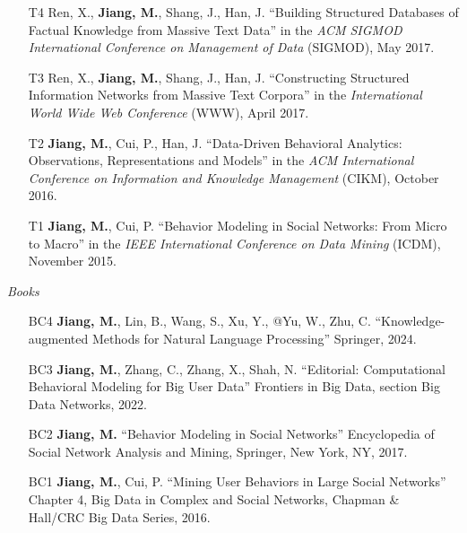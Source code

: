 \documentclass[10pt]{article}
\newenvironment{myindentpar}[1]%
{\begin{list}{}%
         {\setlength{\leftmargin}{#1}}%
         \item[]%
}
{\end{list}}
\newcounter{list}
\begin{document}
\begin{myindentpar}{0.00cm}
\begin{enumerate}[leftmargin=.5cm]
\item[T4] Ren, X., \textbf{Jiang, M.}, Shang, J., Han, J. ``Building Structured Databases of Factual Knowledge from Massive Text Data'' in the \textit{ACM SIGMOD International Conference on Management of Data} (SIGMOD), May 2017.
		
\item[T3] Ren, X., \textbf{Jiang, M.}, Shang, J., Han, J. ``Constructing Structured Information Networks from Massive Text Corpora'' in the \textit{International World Wide Web Conference}  (WWW), April 2017.

\item[T2] \textbf{Jiang, M.}, Cui, P., Han, J. ``Data-Driven Behavioral Analytics: Observations, Representations and Models'' in the \textit{ACM International Conference on Information and Knowledge Management} (CIKM), October 2016.
		
\item[T1] \textbf{Jiang, M.}, Cui, P. ``Behavior Modeling in Social Networks: From Micro to Macro'' in the \textit{IEEE International Conference on Data Mining} (ICDM), November 2015.

\end{enumerate}

\hspace{-0.25cm}\textit{Books}

\begin{enumerate}[leftmargin=.5cm]

\item[BC4] \textbf{Jiang, M.}, Lin, B., Wang, S., Xu, Y., @Yu, W., Zhu, C. ``Knowledge-augmented Methods for Natural Language Processing'' Springer, 2024.

\item[BC3] \textbf{Jiang, M.}, Zhang, C., Zhang, X., Shah, N. ``Editorial: Computational Behavioral Modeling for Big User Data'' Frontiers in Big Data, section Big Data Networks, 2022.
		
\item[BC2] \textbf{Jiang, M.} ``Behavior Modeling in Social Networks'' Encyclopedia of Social Network Analysis and Mining, Springer, New York, NY, 2017.
		
\item[BC1] \textbf{Jiang, M.}, Cui, P. ``Mining User Behaviors in Large Social Networks'' Chapter 4, Big Data in Complex and Social Networks, Chapman \& Hall/CRC Big Data Series, 2016.

\end{enumerate}


\end{myindentpar}
\end{document}
